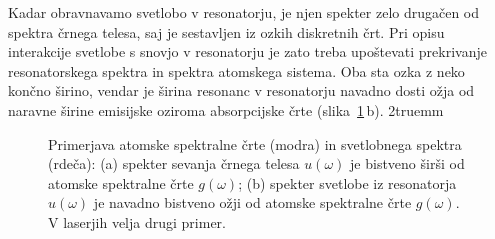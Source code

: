 Kadar obravnavamo svetlobo v resonatorju, je njen spekter zelo drugačen 
od spektra črnega telesa, saj je sestavljen iz ozkih diskretnih črt.
Pri opisu interakcije svetlobe s snovjo v resonatorju je zato treba 
upoštevati prekrivanje resonatorskega spektra in 
spektra atomskega sistema. Oba sta ozka z neko končno širino, vendar 
je širina resonanc v resonatorju navadno dosti ožja od naravne širine 
emisijske oziroma absorpcijske črte (slika~\ref{fig:11_g}\,b).
\vglue2truemm
\begin{figure}[ht!]
\centering
\def\svgwidth{130truemm} 

\caption{Primerjava atomske spektralne črte (modra) in svetlobnega spektra (rdeča): (a)
spekter sevanja črnega telesa $u(\omega)$ je bistveno širši 
od atomske spektralne črte $g(\omega)$; (b) spekter svetlobe iz 
resonatorja $u(\omega)$ je navadno bistveno ožji od atomske 
spektralne črte $g(\omega)$. V laserjih velja drugi primer.
}
\label{fig:11_g}
\end{figure}

